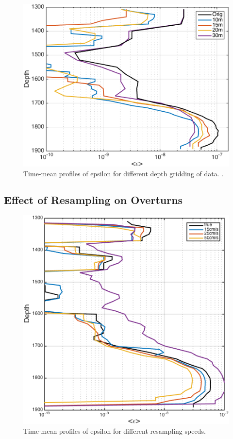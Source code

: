 \documentclass[11pt]{article}
\begin{document}
\begin{figure}[htbp]
\includegraphics[scale=0.8]{T2_EpsProfile_diffdz.png}
\caption{Time-mean profiles of epsilon for different depth gridding of data. .}
\label{}
\end{figure}



\clearpage

\subsection{Effect of Resampling on Overturns}



\begin{figure}[htbp]
\includegraphics[scale=0.8]{T2_EpsProfResamp.png}
\caption{Time-mean profiles of epsilon for different resampling speeds.}
\label{}
\end{figure}
\end{document}
